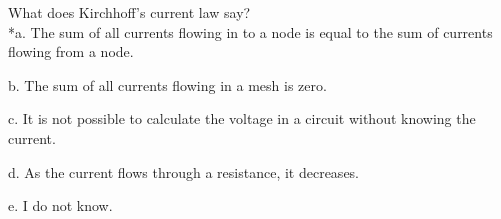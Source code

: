 
What does Kirchhoff's current law say?\\

*a. The sum of all currents flowing in to a node is equal to the sum of currents flowing from a node.

b. The sum of all currents flowing in a mesh is zero.

c. It is not possible to calculate the voltage in a circuit without knowing the current.

d. As the current flows through a resistance, it decreases.

e. I do not know.\\
